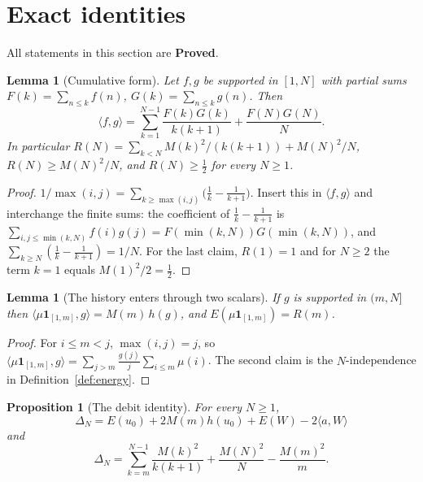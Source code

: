 \documentclass[11pt]{article}
\newtheorem{proposition}[theorem]{Proposition}
\newtheorem{lemma}[theorem]{Lemma}
\theoremstyle{definition}
\theoremstyle{remark}
\newcommand{\ip}[2]{\langle #1,#2\rangle}
\begin{document}
\section{Exact identities}\label{sec:identities}

All statements in this section are \textbf{Proved}.

\begin{lemma}[Cumulative form]\label{lem:cum}
Let $f,g$ be supported in $[1,N]$ with partial sums $F(k)=\sum_{n\le k}f(n)$, $G(k)=\sum_{n\le k}g(n)$. Then
\[
\ip fg=\sum_{k=1}^{N-1}\frac{F(k)G(k)}{k(k+1)}+\frac{F(N)G(N)}N .
\]
In particular $R(N)=\sum_{k<N}M(k)^2/(k(k+1))+M(N)^2/N$, $R(N)\ge M(N)^2/N$, and $R(N)\ge\tfrac12$ for every $N\ge1$.
\end{lemma}

\begin{proof}
$1/\max(i,j)=\sum_{k\ge\max(i,j)}\big(\tfrac1k-\tfrac1{k+1}\big)$. Insert this in $\ip fg$ and interchange the finite sums: the coefficient of $\tfrac1k-\tfrac1{k+1}$ is $\sum_{i,j\le\min(k,N)}f(i)g(j)=F(\min(k,N))G(\min(k,N))$, and $\sum_{k\ge N}(\tfrac1k-\tfrac1{k+1})=1/N$. For the last claim, $R(1)=1$ and for $N\ge2$ the term $k=1$ equals $M(1)^2/2=\tfrac12$.
\end{proof}

\begin{lemma}[The history enters through two scalars]\label{lem:history}
If $g$ is supported in $(m,N]$ then $\ip{\mu\mathbf 1_{[1,m]}}{g}=M(m)\,h(g)$, and $E(\mu\mathbf 1_{[1,m]})=R(m)$.
\end{lemma}

\begin{proof}
For $i\le m<j$, $\max(i,j)=j$, so $\ip{\mu\mathbf 1_{[1,m]}}{g}=\sum_{j>m}\frac{g(j)}j\sum_{i\le m}\mu(i)$. The second claim is the $N$-independence in Definition~\ref{def:energy}.
\end{proof}

\begin{proposition}[The debit identity]\label{prop:debit}
For every $N\ge1$,
\begin{equation}\label{eq:debit}
\Delta_N=E(u_0)+2M(m)h(u_0)+E(W)-2\ip aW
\end{equation}
and
\begin{equation}\label{eq:debitM}
\Delta_N=\sum_{k=m}^{N-1}\frac{M(k)^2}{k(k+1)}+\frac{M(N)^2}N-\frac{M(m)^2}m .
\end{equation}
\end{proposition}
\end{document}
